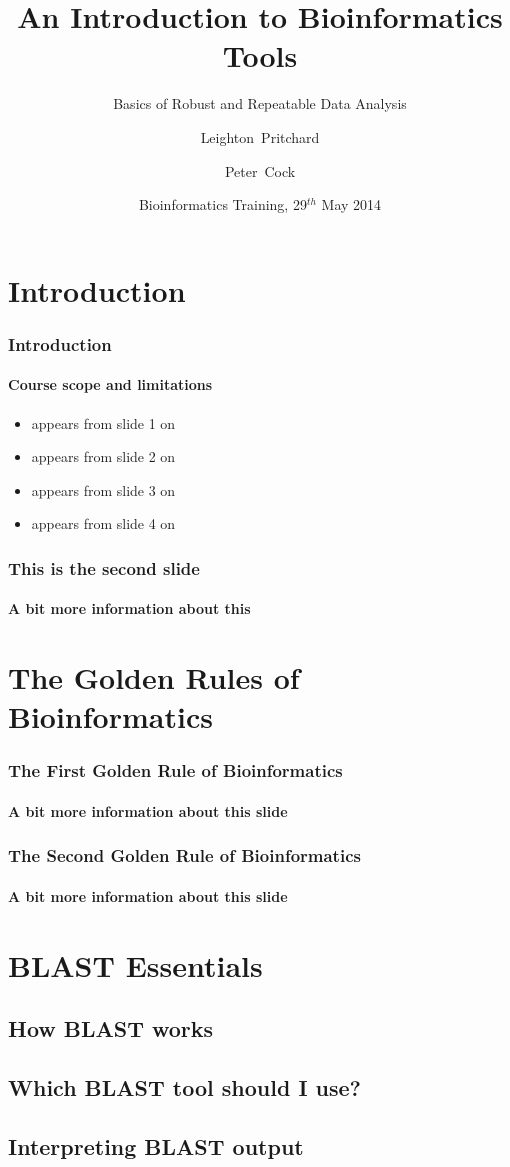 \documentclass{beamer}
\title[Intro to Bioinformatics] %
{An Introduction to Bioinformatics Tools}
\subtitle{Basics of Robust and Repeatable Data Analysis}
\author[Pritchard, Cock] %
{Leighton~Pritchard \and Peter~Cock}
\institute[The James Hutton Institute] %
{
  Information and Computational Sciences\\
  The James Hutton Institute
}
\date[May 2014] %
{Bioinformatics Training, 29$^{th}$ May 2014}
\begin{document}
  \frame[plain]{\titlepage}

  \section{Introduction}
  \begin{frame}
    \frametitle{Introduction}
    \framesubtitle{Course scope and limitations}
    \begin{itemize}
	\item<1-2> appears from slide 1 on
	\item<2-> appears from slide 2 on
	\item<3-> appears from slide 3 on
	\item<4-> appears from slide 4 on
	\end{itemize}
  \end{frame}

  \begin{frame}
    \frametitle{This is the second slide}
    \framesubtitle{A bit more information about this}
  \end{frame}

  \section{The Golden Rules of Bioinformatics}
  \begin{frame}
    \frametitle{The First Golden Rule of Bioinformatics}
    \framesubtitle{A bit more information about this slide}
  \end{frame}

  \begin{frame}
    \frametitle{The Second Golden Rule of Bioinformatics}
    \framesubtitle{A bit more information about this slide}
  \end{frame}


  \section{BLAST Essentials}
  \subsection{How BLAST works}
  \subsection{Which BLAST tool should I use?}
  \subsection{Interpreting BLAST output}


  \section{}


\end{document}

